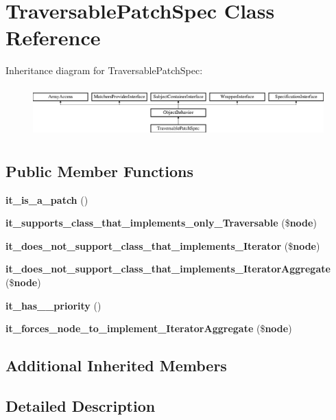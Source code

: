\section{Traversable\+Patch\+Spec Class Reference}
\label{classspec_1_1_prophecy_1_1_doubler_1_1_class_patch_1_1_traversable_patch_spec}
Inheritance diagram for Traversable\+Patch\+Spec\+:\begin{figure}[H]
\begin{center}
\leavevmode
\includegraphics[height=1.953488cm]{classspec_1_1_prophecy_1_1_doubler_1_1_class_patch_1_1_traversable_patch_spec}
\end{center}
\end{figure}
\subsection*{Public Member Functions}
\begin{DoxyCompactItemize}
\item 
{\bf it\+\_\+is\+\_\+a\+\_\+patch} ()
\item 
{\bf it\+\_\+supports\+\_\+class\+\_\+that\+\_\+implements\+\_\+only\+\_\+\+Traversable} (\${\bf node})
\item 
{\bf it\+\_\+does\+\_\+not\+\_\+support\+\_\+class\+\_\+that\+\_\+implements\+\_\+\+Iterator} (\${\bf node})
\item 
{\bf it\+\_\+does\+\_\+not\+\_\+support\+\_\+class\+\_\+that\+\_\+implements\+\_\+\+Iterator\+Aggregate} (\${\bf node})
\item 
{\bf it\+\_\+has\+\_\+\_\+priority} ()
\item 
{\bf it\+\_\+forces\+\_\+node\+\_\+to\+\_\+implement\+\_\+\+Iterator\+Aggregate} (\${\bf node})
\end{DoxyCompactItemize}
\subsection*{Additional Inherited Members}


\subsection{Detailed Description}


